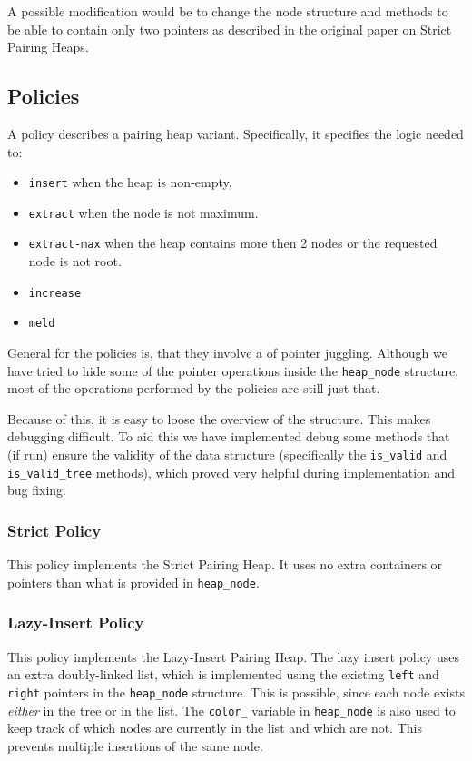 \documentclass{DIKU-article}[2010/01/13]
\newcommand{\code}[1]{{\small\texttt{#1}}}
\begin{document}
A possible modification would be to change the node structure and
methods to be able to contain only two pointers as described in the
original paper on Strict Pairing Heaps\cite{fredman}.

\subsection{Policies}

A policy describes a pairing heap variant. Specifically, it specifies
the logic needed to:
\begin{itemize}
\item \code{insert} when the heap is non-empty,
\item \code{extract} when the node is not maximum.
\item \code{extract-max} when the heap contains more then 2 nodes or the
  requested node is not root.
\item \code{increase}
\item \code{meld}
\end{itemize}

General for the policies is, that they involve a of pointer
juggling. Although we have tried to hide some of the pointer
operations inside the \code{heap\_node} structure, most of the
operations performed by the policies are still just that.

Because of this, it is easy to loose the overview of the
structure. This makes debugging difficult. To aid this we have
implemented debug some methods that (if run) ensure the validity of
the data structure (specifically the \code{is\_valid} and
\code{is\_valid\_tree} methods), which proved very helpful during
implementation and bug fixing.

\subsubsection{Strict Policy}

This policy implements the Strict Pairing Heap. It uses no extra
containers or pointers than what is provided in \code{heap\_node}.

\subsubsection{Lazy-Insert Policy}
\label{sec:policy-lazy-insert}

This policy implements the Lazy-Insert Pairing Heap. The lazy insert
policy uses an extra doubly-linked list, which is implemented using
the existing \code{left} and \code{right} pointers in the
\code{heap\_node} structure. This is possible, since each node exists
\emph{either} in the tree or in the list. The \code{color\_} variable
in \code{heap\_node} is also used to keep track of which nodes are
currently in the list and which are not. This prevents multiple
insertions of the same node.
\end{document}
